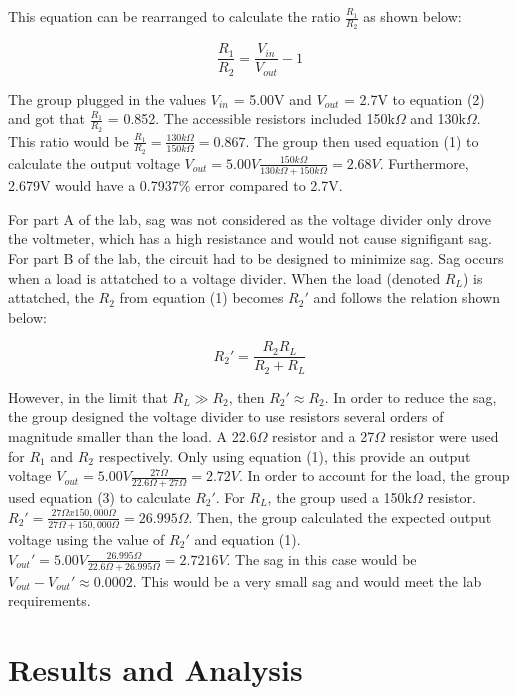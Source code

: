 \documentclass[twocolumn, amsmath]{revtex4}
\begin{document}
This equation can be rearranged to calculate the ratio $\frac{R_1}{R_2}$ as shown below:

\begin{equation}
\frac{R_1}{R_2} = \frac{V_{in}}{V_{out}}-1
\end{equation}

The group plugged in the values $V_{in}$ = 5.00V and $V_{out}$ = 2.7V to equation (2) and got that $\frac{R_1}{R_2}$ = 0.852. The accessible resistors included 150k$\Omega$ and 130k$\Omega$. This ratio would be $\frac{R_1}{R_2} = \frac{130k\Omega}{150k\Omega} = 0.867$. The group then used equation (1) to calculate the output voltage $V_{out} = 5.00V\frac{150k\Omega}{130k\Omega + 150k\Omega} = 2.68V$. Furthermore, 2.679V would have a 0.7937\% error compared to 2.7V.


For part A of the lab, sag was not considered as the voltage divider only drove the voltmeter, which has a high resistance and would not cause signifigant sag. For part B of the lab, the circuit had to be designed to minimize sag. Sag occurs when a load is attatched to a voltage divider. When the load (denoted $R_L$) is attatched, the $R_2$ from equation (1) becomes $R_2'$ and follows the relation shown below:

\begin{equation}
R_2' = \frac{R_2R_L}{R_2 + R_L}
\end{equation}

However, in the limit that $R_L \gg R_2$, then $R_2' \approx R_2$. In order to reduce the sag, the group designed the voltage divider to use resistors several orders of magnitude smaller than the load. A 22.6$\Omega$ resistor and a 27$\Omega$ resistor were used for $R_1$ and $R_2$ respectively. Only using equation (1), this provide an output voltage $V_{out} = 5.00V\frac{27\Omega}{22.6\Omega + 27\Omega} = 2.72V$. In order to account for the load, the group used equation (3) to calculate $R_2'$. For $R_L$, the group used a 150k$\Omega$ resistor. $R_2' = \frac{27\Omega x150,000\Omega}{27\Omega + 150,000\Omega} = 26.995\Omega$. Then, the group calculated the expected output voltage using the value of $R_2'$ and equation (1). $V_{out}' = 5.00V\frac{26.995\Omega}{22.6\Omega + 26.995\Omega} = 2.7216V$. The sag in this case would be $V_{out} - V_{out}' \approx 0.0002$. This would be a very small sag and would meet the lab requirements.


\section{Results and Analysis}
\end{document}

